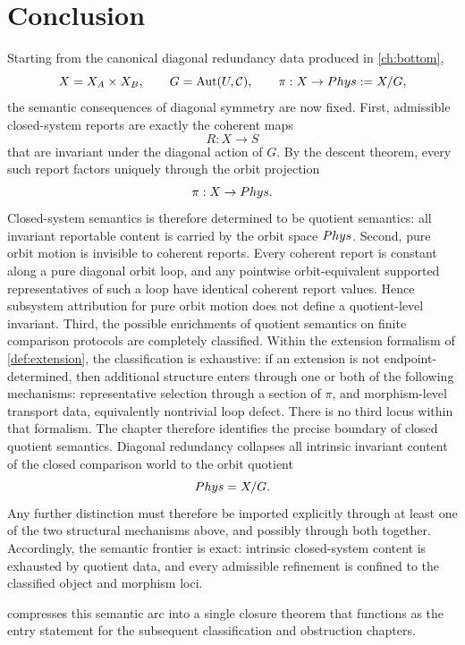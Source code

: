 \section{Conclusion}
\label{sec:rotation-conclusion}
Starting from the canonical diagonal redundancy data produced in
\cref{ch:bottom},
\[
	X=X_A\times X_B,
	\qquad
	G=\operatorname{Aut}(U,\mathcal C),
	\qquad
	\pi:X\to Phys:=X/G,
\]
the semantic consequences of diagonal symmetry are now fixed.
First, admissible closed-system reports are exactly the coherent maps
\[
	R:X\to S
\]
that are invariant under the diagonal action of \(G\). By the descent
theorem, every such report factors uniquely through the orbit
projection
\[
	\pi:X\to Phys.
\]
Closed-system semantics is therefore determined to be quotient semantics:
all invariant reportable content is carried by the orbit space
\(Phys\).
Second, pure orbit motion is invisible to coherent reports. Every
coherent report is constant along a pure diagonal orbit loop, and any
pointwise orbit-equivalent supported representatives of such a loop
have identical coherent report values. Hence subsystem attribution for
pure orbit motion does not define a quotient-level invariant.
Third, the possible enrichments of quotient semantics on finite
comparison protocols are completely classified. Within the extension
formalism of \cref{def:extension}, the classification is exhaustive: if
an extension is not endpoint-determined, then additional structure
enters through one or both of the following mechanisms:
representative selection through a section of \(\pi\), and
morphism-level transport data, equivalently nontrivial loop defect.
There is no third locus within that formalism.
The chapter therefore identifies the precise boundary of closed
quotient semantics. Diagonal redundancy collapses all intrinsic
invariant content of the closed comparison world to the orbit quotient
\[
	Phys=X/G.
\]
Any further distinction must therefore be imported explicitly through
at least one of the two structural mechanisms above, and possibly
through both together.
Accordingly, the semantic frontier is exact: intrinsic closed-system
content is exhausted by quotient data, and every admissible refinement is
confined to the classified object and morphism loci.

 compresses this semantic arc into a single closure
theorem that functions as the entry statement for the subsequent
classification and obstruction chapters.

\begin{chapterclosing}
\end{chapterclosing}
